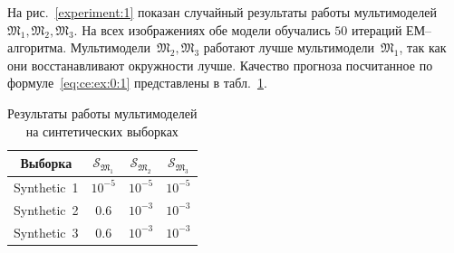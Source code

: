 \documentclass[12pt, twoside]{article}
\numberwithin{equation}{section}
\begin{document}

На рис.~\ref{experiment:1} показан случайный результаты работы мультимоделей~$\mathfrak{M}_1, \mathfrak{M}_2, \mathfrak{M}_3$. На всех изображениях обе модели обучались $50$ итераций ЕМ--алгоритма. Мультимодели~$\mathfrak{M}_2, \mathfrak{M}_3$ работают лучше мультимодели~$\mathfrak{M}_1$, так как они восстанавливают окружности лучше. Качество прогноза посчитанное по формуле~\eqref{eq:ce:ex:0:1} представлены в табл.~\ref{tb:ce:1}.

\begin{table}[h!t]
\begin{center}
\caption{Результаты работы мультимоделей на синтетических выборках}
\label{tb:ce:1}
\begin{tabular}{|c|c|c|c|}
\hline
	Выборка & $\mathcal{S}_{\mathfrak{M}_1}$ & $\mathcal{S}_{\mathfrak{M}_2} $& $\mathcal{S}_{\mathfrak{M}_3} $\\
	\hline
	\multicolumn{1}{|l|}{Synthetic~1}
	& $10^{-5}$& $10^{-5}$& $10^{-5}$\\
	\hline
	\multicolumn{1}{|l|}{Synthetic~2}
	& $0.6$& $10^{-3}$& $10^{-3}$\\
	\hline
	\multicolumn{1}{|l|}{Synthetic~3}
	& $0.6$& $10^{-3}$& $10^{-3}$\\
\hline
\end{tabular}
\end{center}
\end{table}


\end{document}

